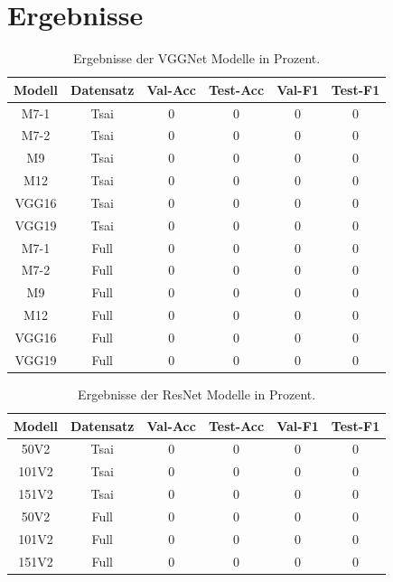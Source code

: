 \documentclass[twoside,a4paper]{IEEEtran}
\begin{document}
\section{Ergebnisse} %
\begin{table}[!htb]
	\caption{Ergebnisse der VGGNet Modelle in Prozent.}
	\label{vgg_ergebnis}
	\centering
	\begin{tabular}{|c|c|c|c|c|c|}
		\hline
		Modell & Datensatz & Val-Acc & Test-Acc & Val-F1 & Test-F1\\
		\hline
		\hline
		M7-1 & Tsai & 0 & 0 & 0 & 0\\
		\hline
		M7-2 & Tsai & 0 & 0 & 0 & 0\\
		\hline
		M9 & Tsai & 0 & 0 & 0 & 0\\
		\hline 
		M12 & Tsai & 0 & 0 & 0 & 0\\
		\hline 
		VGG16 & Tsai & 0 & 0 & 0 & 0\\
		\hline 
		VGG19 & Tsai & 0 & 0 & 0 & 0\\
		\hline 
		\hline 
		M7-1 & Full & 0 & 0 & 0 & 0\\
		\hline
		M7-2 & Full & 0 & 0 & 0 & 0\\
		\hline
		M9 & Full & 0 & 0 & 0 & 0\\
		\hline 
		M12 & Full & 0 & 0 & 0 & 0\\
		\hline 
		VGG16 & Full & 0 & 0 & 0 & 0\\
		\hline 
		VGG19 & Full & 0 & 0 & 0 & 0\\
		\hline 
	\end{tabular}
\end{table}
\begin{table}[!htb]
	\caption{Ergebnisse der ResNet Modelle in Prozent.}
	\label{resnet_ergebnis}
	\centering
	\begin{tabular}{|c|c|c|c|c|c|}
		\hline
		Modell & Datensatz & Val-Acc & Test-Acc & Val-F1 & Test-F1\\
		\hline
		\hline
	 	50V2 & Tsai & 0 & 0 & 0 & 0\\
		\hline
		101V2 & Tsai & 0 & 0 & 0 & 0\\
		\hline
		151V2 & Tsai & 0 & 0 & 0 & 0\\
		\hline 
		\hline 
		50V2 & Full & 0 & 0 & 0 & 0\\
		\hline
		101V2 & Full & 0 & 0 & 0 & 0\\
		\hline
		151V2 & Full & 0 & 0 & 0 & 0\\
		\hline 
	\end{tabular}
\end{table}
\end{document}
